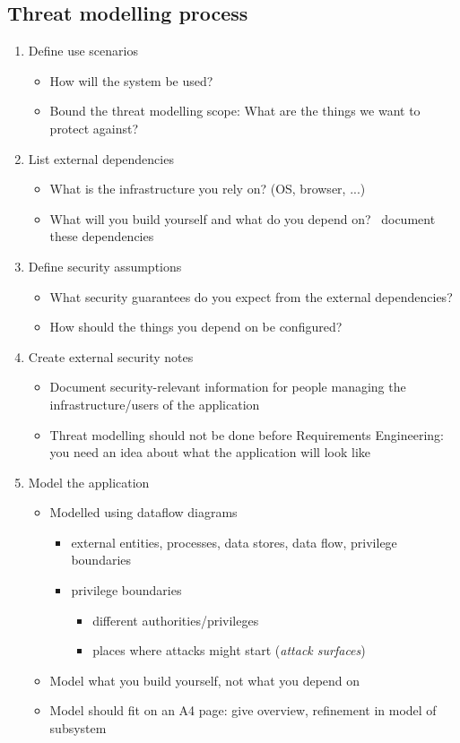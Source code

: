 \documentclass[12pt,titlepage,a4paper]{report}
\begin{document}
			\subsection{Threat modelling process}
			\begin{enumerate}
				\item Define use scenarios
				\begin{itemize}
					\item How will the system be used?
					\item Bound the threat modelling scope: What are the things we want to protect against?
				\end{itemize}
				\item List external dependencies
				\begin{itemize}
					\item What is the infrastructure you rely on? (OS, browser, ...)
					\item What will you build yourself and what do you depend on? \textrightarrow \, document these dependencies
				\end{itemize}
				\item Define security assumptions
				\begin{itemize}
					\item What security guarantees do you expect from the external dependencies?
					\item How should the things you depend on be configured?
				\end{itemize}
				\item Create external security notes
				\begin{itemize}
					\item Document security-relevant information for people managing the infrastructure/users of the application
					\item Threat modelling should not be done before Requirements Engineering: you need an idea about what the application will look like
				\end{itemize}
				\item Model the application
				\begin{itemize}
					\item Modelled using dataflow diagrams
					\begin{itemize}
						\item external entities, processes, data stores, data flow, privilege boundaries
						\item privilege boundaries
						\begin{itemize}
							\item different authorities/privileges
							\item places where attacks might start (\emph{attack surfaces})
						\end{itemize}
					\end{itemize}
					\item Model what you build yourself, not what you depend on
					\item Model should fit on an A4 page: give overview, refinement in model of subsystem
					

\end{itemize}
\end{enumerate}
\end{document}
